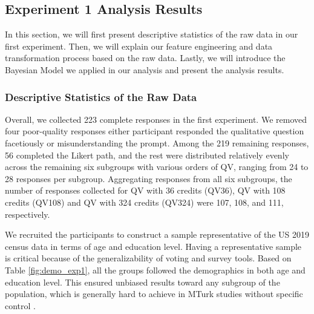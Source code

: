 \subsection{Experiment 1 Analysis Results} \label{results-1-quan}
In this section, 
we will first present descriptive statistics 
of the raw data in our first experiment. 
Then, we will explain our feature engineering 
and data transformation process 
based on the raw data. 
Lastly, we will introduce the Bayesian Model 
we applied in our analysis 
and present the analysis results.

\subsubsection{Descriptive Statistics of the Raw Data}
    
Overall, we collected 223 complete responses in the first experiment. 
We removed four poor-quality responses 
either participant responded the qualitative question facetiously 
or misunderstanding the prompt. 
Among the 219 remaining responses, 
56 completed the Likert path, 
and the rest were distributed relatively evenly 
across the remaining six subgroups with various orders of QV, 
ranging from 24 to 28 responses per subgroup. 
Aggregating responses from all six subgroups, 
the number of responses collected for QV with 36 credits (QV36), 
QV with 108 credits (QV108) and QV with 324 credits (QV324) 
were 107, 108, and 111, respectively. 

We recruited the participants 
to construct a sample 
representative of the US 2019 census data 
in terms of age and education level. 
Having a representative sample is critical because of the generalizability of voting and survey tools. 
Based on Table \ref{fig:demo_exp1}, 
all the groups followed the demographics in both age and education level. 
This ensured unbiased results toward any subgroup of the population, 
which is generally hard to achieve in MTurk studies without specific control \cite{difallah2018demographics}.

